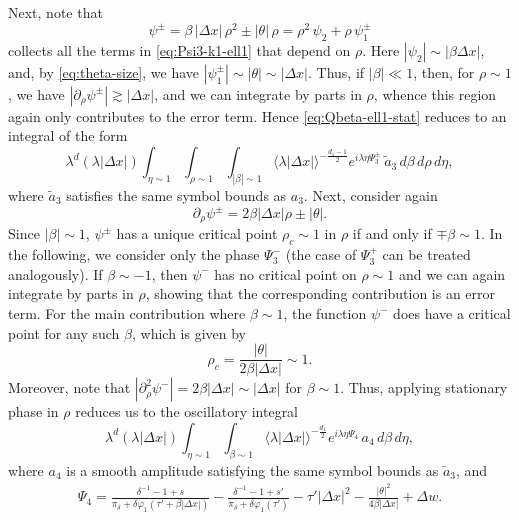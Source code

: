 \documentclass[leqno]{amsart}
\theoremstyle{definition}
\theoremstyle{remark}
\numberwithin{equation}{section}
\begin{document}
Next, note that
\[
\psi^{\pm}=\beta\,|\Delta x|\,\rho^2 \pm |\theta|\,\rho
= \rho^2\,\psi_2 + \rho\,\psi_1^{\pm}
\]
collects all the terms in \eqref{eq:Psi3-k1-ell1} that depend on $\rho$. Here $|\psi_2|\sim |\beta\Delta x|$, and, by \eqref{eq:theta-size}, we have $|\psi_1^{\pm}|\sim |\theta|\sim |\Delta x|$. Thus, if $|\beta|\ll 1$, then, for $\rho\sim 1$, we have $|\partial_\rho\psi^{\pm}|\gtrsim |\Delta x|$, and we can integrate by parts in $\rho$, whence this region again only contributes to the error term. Hence \eqref{eq:Qbeta-ell1-stat} reduces to an integral of the form
\begin{equation}\label{eq:ell1-rhoSP-pre}
\lambda^{d}(\lambda|\Delta x|)\int_{\eta\sim 1}\int_{\rho\sim 1}\int_{|\beta|\sim 1}
\langle \lambda |\Delta x|\rangle^{-\frac{d_1-1}{2}}
e^{i\lambda\eta \Psi_3^{\pm}}\,
\tilde a_3\, d\beta\, d\rho\, d\eta,
\end{equation}
where $\tilde a_3$ satisfies the same symbol bounds as $a_3$. Next, consider again
\[
\partial_\rho\psi^{\pm} = 2\beta|\Delta x|\rho \pm |\theta|.
\]
Since $|\beta|\sim 1$, $\psi^{\pm}$ has a unique critical point $\rho_c\sim 1$ in $\rho$ if and only if $\mp\beta\sim 1$. In the following, we consider only the phase $\Psi_3^{-}$ (the case of $\Psi_3^{+}$ can be treated analogously). If $\beta\sim -1$, then $\psi^{-}$ has no critical point on $\rho\sim 1$ and we can again integrate by parts in $\rho$, showing that the corresponding contribution is an error term. For the main contribution where $\beta\sim 1$, the function $\psi^{-}$ does have a critical point for any such $\beta$, which is given by
\[
\rho_c=\frac{|\theta|}{2\beta|\Delta x|}\sim 1.
\]
Moreover, note that $|\partial_\rho^2\psi^{-}|=2\beta|\Delta x|\sim |\Delta x|$ for $\beta \sim 1$. Thus, applying stationary phase in $\rho$ reduces us to the oscillatory integral
\begin{equation}\label{eq:ell1-rhoSP}
\lambda^{d}(\lambda|\Delta x|)\int_{\eta\sim 1}\int_{\beta\sim 1}
\langle \lambda|\Delta x|\rangle^{-\frac{d_1}{2}}
e^{i\lambda\eta \Psi_4 }\,
a_4 \, d\beta\, d\eta,
\end{equation}
where $a_4$ is a smooth amplitude satisfying the same symbol bounds as $\tilde a_3$, and
\begin{multline}\label{eq:ell1-Psi4}
\Psi_4 
=
\frac{\delta^{-1}-1+s}{\pi_\delta+\delta\varphi_1(\tau'+\beta|\Delta x|)}
-\frac{\delta^{-1}-1+s'}{\pi_\delta+\delta\varphi_1(\tau')}
-\tau' |\Delta x|^2
-\frac{|\theta|^2}{4\beta|\Delta x|}
+\Delta w.
\end{multline}
\end{document}
